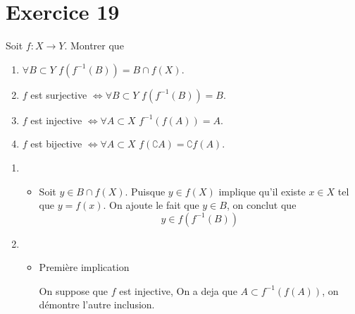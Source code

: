 \documentclass{report}
\begin{document}
\section{Exercice 19}
\qs{}
{
Soit $f : X \rightarrow Y$. Montrer que
\begin{enumerate}
\item $\forall B \subset Y \, \, f (f^{-1} (B)) = B \cap f (X)$.
\item $f$ est surjective $\iff \forall B \subset Y \, \, f (f^{-1} (B)) = B $.
\item $f$ est injective $\iff \forall A \subset X \, \, f^{-1} (f(A)) = A $.
\item $f$ est bijective $\iff \forall A \subset X \, \,f (\complement A) = \complement f (A).$
\end{enumerate}
}
\begin{myproof}
 \begin{enumerate}
   \item 
     \begin{itemize}
     Soit $y\in f(f^{-1}(B)) \implies \exists x \in f^{-1}(B) \text{ tel que
     } y = f(x) $.\\

     Puisque $x\in f^{-1}(B) \implies f(x) = y \in B$ Ainsi 
     $$
     y \in B \cap f(X)
     $$
   \item Soit $y \in B\cap f(X)$.
     Puisque $y \in f(X)$ implique qu'il existe $x \in X$ tel que $y = f(x)$. On
     ajoute le fait que $y\in B$, on conclut que 
     $$
     y \in f(f^{-1}(B))
     $$
 \end{itemize}
\item 
  \begin{itemize}
    Pour la première implication, on suppose que $f$ est \textbf{surjective}, en
    utilisant la premiere question on as:
    $$
    f(f^{-1}(B)) = B \cap f(X)
    $$
    Le fait que $f$ est surjective implique que $f(X) = Y$  Ainsi 

    $$
    f(f^{-1}(B)) = B \cap Y = B
    $$
    Pour la deuxième implication: on considère l'égalité pour $B=Y$.
$$
f(f^{-1}(Y)) = Y
$$

Ce qui implique que 

$$
F(X) = Y
$$
Ainsi $f$ est surjective.

\item 
  Première implication

  On suppose que $f$ est injective, 
  On a deja que $A \subset f^{-1}(f(A))$, on démontre l'autre inclusion.\\


\end{itemize}
\end{enumerate}
\end{myproof}
\end{document}

